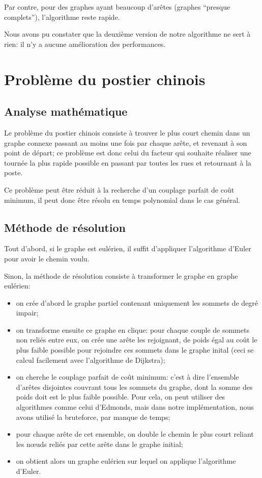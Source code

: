 \documentclass{scrartcl}
\begin{document}
    Par contre, pour des graphes ayant beaucoup d'arêtes (graphes ``presque
    complets''), l'algorithme reste rapide.

    Nous avons pu constater que la deuxième version de notre algorithme ne sert
    à rien: il n'y a aucune amélioration des performances.

\section{Problème du postier chinois}
  \subsection{Analyse mathématique}
    Le problème du postier chinois consiste à trouver le plus court chemin dans
    un graphe connexe passant au moins une fois par chaque arête, et revenant
    à son point de départ; ce problème est donc celui du facteur qui souhaite
    réaliser une tournée la plus rapide possible en passant par toutes les rues
    et retournant à la poste. 

    Ce problème peut être réduit à la recherche d'un couplage parfait de coût
    minimum, il peut donc être résolu en temps polynomial dans le cas général.

  \subsection{Méthode de résolution}
    Tout d'abord, si le graphe est eulérien, il suffit d'appliquer l'algorithme
    d'Euler pour avoir le chemin voulu.

    Sinon, la méthode de résolution consiste à transformer le graphe en graphe
    eulérien:
    \begin{itemize}
      \item on crée d'abord le graphe partiel contenant uniquement les sommets
        de degré impair;
      \item on transforme ensuite ce graphe en clique: pour chaque couple de
        sommets non reliés entre eux, on crée une arête les rejoignant,
        de poids égal au coût le plus faible possible pour rejoindre ces
        sommets dans le graphe inital (ceci se calcul facilement avec
        l'algorithme de Dijkstra);
      \item on cherche le couplage parfait de coût minimum: c'est à dire
        l'ensemble d'arêtes disjointes couvrant tous les sommets du graphe,
        dont la somme des poids doit est le plus faible possible.
        Pour cela, on peut utiliser des algorithmes comme celui d'Edmonds, mais
        dans notre implémentation, nous avons utilisé la bruteforce, par manque
        de temps;
      \item pour chaque arête de cet ensemble, on double le chemin le plus court
        reliant les nœuds reliés par cette arête dans le graphe initial;
      \item on obtient alors un graphe eulérien sur lequel on applique
        l'algorithme d'Euler.
    \end{itemize}
\end{document}
